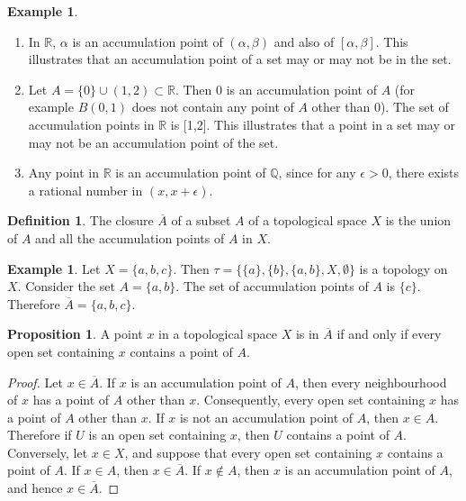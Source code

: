 \documentclass[11pt,a4paper]{article}
\theoremstyle{definition}
\newtheorem{defn}[thm]{Definition}
\newtheorem{exa}[thm]{Example}
\newtheorem{prop}[thm]{Proposition}
\begin{document}
\begin{exa}
\begin{enumerate}
\item[a.] In $\mathbb{R}$, $\alpha$ is an accumulation point of $(\alpha,\beta)$ and also of $[\alpha,\beta]$. This illustrates that an accumulation point of a set may or may not be in the set.
\item[b.] Let $A=\{0\}\cup (1,2)\subset \mathbb{R}$. Then 0 is an accumulation point of $A$ (for example $B(0,1)$ does not contain any point of $A$ other than 0). The set of accumulation points in $\mathbb{R}$ is [1,2]. This illustrates that a point in a set may or may not be an accumulation point of the set.
\item[c.] Any point in $\mathbb{R}$ is an accumulation point of $\mathbb{Q}$, since for any $\epsilon >0$, there exists a rational number in $(x,x+\epsilon)$.
\end{enumerate}
\end{exa}


\begin{defn}
 The closure $\overline{A}$ of a subset $A$ of a topological space $X$ is the union of $A$ and all the accumulation points of $A$ in $X$.
\end{defn}
 
 
\begin{exa}
Let $X=\{a,b,c\}$. Then $\tau=\{\{a\},\{b\},\{a,b\},X,\emptyset \}$ is a topology on $X$. Consider the set $A=\{a,b\}$. The set of accumulation points of $A$ is $\{c\}$.
Therefore $\overline{A}=\{a,b,c\}$.
\end{exa}
 
 
 
 
\begin{prop}
A point $x$ in a topological space $X$ is in $\overline{A}$ if and only if every open set containing $x$ contains a point of $A$.
\end{prop}
 
\begin{proof}
Let $x\in \overline{A}$. If $x$ is an accumulation point of $A$, then every neighbourhood of $x$ has a point of $A$ other than $x$. Consequently, every open set containing $x$ has a point of $A$ other than $x$. If $x$ is not an accumulation point of $A$, then $x\in A$. Therefore if $U$ is an open set containing $x$, then $U$ contains a point of $A$.\\ 
Conversely, let $x\in X$, and suppose that every open set containing $x$ contains a point of $A$. If $x\in A$, then $x\in \overline{A}$. If $x\not\in A$, then $x$ is an accumulation point of $A$, and hence $x\in \overline{A}$.
\end{proof}
\end{document}
